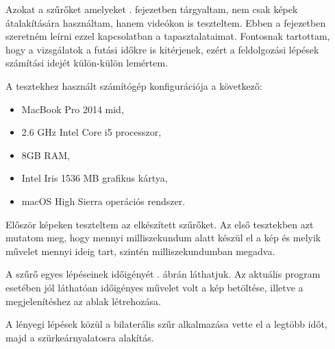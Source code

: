 
\label{chap:tests}

Azokat a szűrőket amelyeket . fejezetben tárgyaltam, nem csak képek átalakítására használtam, hanem videókon is teszteltem. Ebben a fejezetben szeretném leírni ezzel kapcsolatban a tapasztalataimat.  Fontosnak tartottam, hogy a vizsgálatok a futási időkre is kitérjenek, ezért a feldolgozási lépések számítási idejét külön-külön lemértem.

A tesztekhez használt számítógép konfigurációja a következő:
\begin{itemize}
\item MacBook Pro 2014 mid,
\item 2.6 GHz Intel Core i5 processzor,
\item 8GB RAM,
\item Intel Iris 1536 MB grafikus kártya,
\item macOS High Sierra operációs rendszer.
\end{itemize}


Először képeken teszteltem az elkészített szűrőket. Az első tesztekben azt mutatom meg, hogy mennyi milliszekundum alatt készül el a kép és melyik művelet mennyi ideig tart, szintén milliszekundumban megadva.

\newpage


A szűrő egyes lépéseinek időigényét . ábrán láthatjuk. Az aktuális program esetében jól láthatóan időigényes művelet volt a kép betöltése, illetve a megjelenítéshez az ablak létrehozása.

A lényegi lépések közül a bilaterális szűr alkalmazása vette el a legtöbb időt, majd a szürkeárnyalatosra alakítás.


